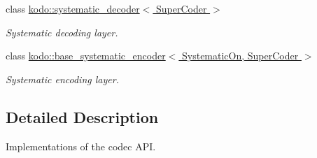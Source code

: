 \begin{DoxyCompactItemize}
class \hyperlink{classkodo_1_1systematic__decoder}{kodo\-::systematic\-\_\-decoder$<$ Super\-Coder $>$}
\begin{DoxyCompactList}\small\item\em Systematic decoding layer. \end{DoxyCompactList}\item 
class \hyperlink{classkodo_1_1base__systematic__encoder}{kodo\-::base\-\_\-systematic\-\_\-encoder$<$ Systematic\-On, Super\-Coder $>$}
\begin{DoxyCompactList}\small\item\em Systematic encoding layer. \end{DoxyCompactList}\end{DoxyCompactItemize}


\subsection{Detailed Description}
Implementations of the codec A\-P\-I. 